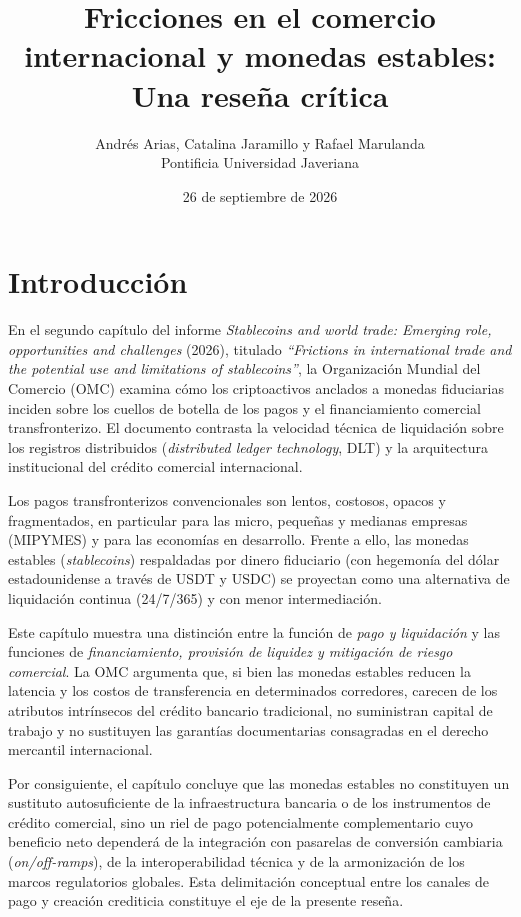 \documentclass[spanish,11pt]{article}
\title{Fricciones en el comercio internacional y monedas estables:\\
\large Una reseña crítica}
\author{Andrés Arias, Catalina Jaramillo y Rafael Marulanda\\
  {\small Pontificia Universidad Javeriana}}
\date{26 de septiembre de 2026}
\begin{document}
\maketitle

\section{Introducción}\label{introduccion}

En el segundo capítulo del informe \emph{Stablecoins and world trade: Emerging role, opportunities and challenges} (2026), titulado 
\emph{``Frictions in international trade and the potential use and limitations of stablecoins''}, la Organización Mundial del 
Comercio (OMC) examina cómo los criptoactivos anclados a monedas fiduciarias inciden sobre los cuellos de botella de los pagos
 y el financiamiento comercial transfronterizo. El documento contrasta la velocidad técnica de liquidación sobre los 
 registros distribuidos (\emph{distributed ledger technology}, DLT) y la arquitectura institucional del crédito 
 comercial internacional.

Los pagos transfronterizos convencionales son lentos, costosos, opacos y fragmentados, en particular para las micro, pequeñas 
y medianas empresas (MIPYMES) y para las economías en desarrollo. Frente a ello, las monedas 
estables (\emph{stablecoins}) respaldadas por dinero fiduciario (con hegemonía del dólar estadounidense a 
través de USDT y USDC) se proyectan como una alternativa de liquidación continua (24/7/365) y con menor intermediación.

Este capítulo muestra una distinción entre la función de \emph{pago y liquidación} y las funciones de 
\emph{financiamiento, provisión de liquidez y mitigación de riesgo comercial}. La OMC argumenta que, si bien las monedas 
estables reducen la latencia y los costos de transferencia en determinados corredores, carecen de los atributos intrínsecos 
del crédito bancario tradicional, no suministran capital de trabajo y no sustituyen las garantías documentarias consagradas 
en el derecho mercantil internacional. 

Por consiguiente, el capítulo concluye que las monedas estables no constituyen un sustituto autosuficiente de la infraestructura 
bancaria o de los instrumentos de crédito comercial, sino un riel de pago potencialmente complementario cuyo 
beneficio neto dependerá de la integración con pasarelas de conversión cambiaria (\emph{on/off-ramps}), de la interoperabilidad 
técnica y de la armonización de los marcos regulatorios globales. Esta delimitación conceptual entre los canales de pago y 
creación crediticia constituye el eje de la presente reseña.
\end{document}
